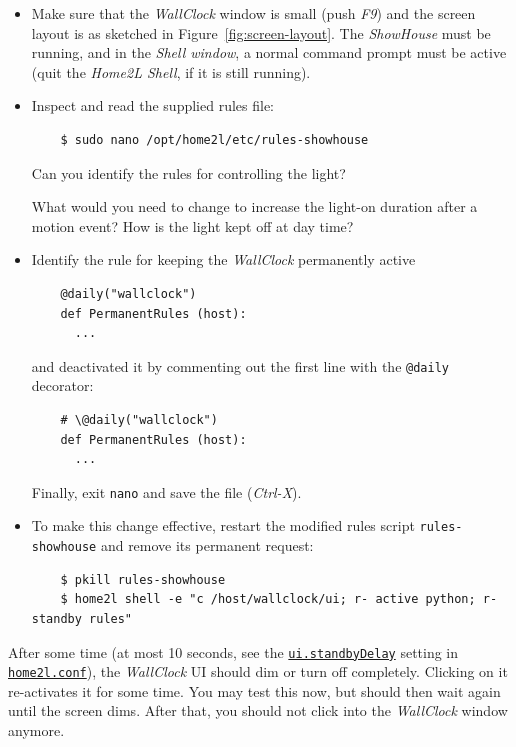 \documentclass[12pt,english,parskip=half]{scrreprt}
\newcommand{\idx}[1]{#1\index{#1}}
\newcommand{\envref}[1]{\hyperref[env:#1]{\texttt{#1}}}        %
\newcommand{\toolref}[1]{\hyperref[tool:#1]{\texttt{\idx{#1}}}}
\begin{document}
\begin{itemize}[$\blacktriangleright$]

\item
  Make sure that the \emph{WallClock} window is small (push \emph{F9})
  and the screen layout is as sketched in Figure~\ref{fig:screen-layout}.
  The \emph{ShowHouse} must be running, and in the
  \emph{Shell window}, a normal command prompt must be active (quit the
  \emph{Home2L Shell}, if it is still running).

\item
  Inspect and read the supplied rules file:
  \begin{lstlisting}
    $ sudo nano /opt/home2l/etc/rules-showhouse
  \end{lstlisting}

  Can you identify the rules for controlling the light?

  What would you need to change to increase the light-on duration after a motion event?
  How is the light kept off at day time?

\item
  Identify the rule for keeping the \emph{WallClock} permanently active
  \begin{lstlisting}
    @daily("wallclock")
    def PermanentRules (host):
      ...
  \end{lstlisting}
  and deactivated it by commenting out the first line with the
  \texttt{@daily} decorator:
  \begin{lstlisting}
    # \@daily("wallclock")
    def PermanentRules (host):
      ...
  \end{lstlisting}
  Finally, exit \texttt{nano} and save the file (\emph{Ctrl-X}).

\item
  To make this change effective, restart the modified rules script
  \texttt{rules-showhouse} and remove its permanent request:
  \begin{lstlisting}
    $ pkill rules-showhouse
    $ home2l shell -e "c /host/wallclock/ui; r- active python; r- standby rules"
  \end{lstlisting}

\end{itemize}

After some time (at most 10 seconds, see the \envref{ui.standbyDelay} setting in
\toolref{home2l.conf}), the \emph{WallClock} UI should dim or turn off
completely. Clicking on it re-activates it for some time. You may test
this now, but should then wait again until the screen dims. After that,
you should not click into the \emph{WallClock} window anymore.
\end{document}
